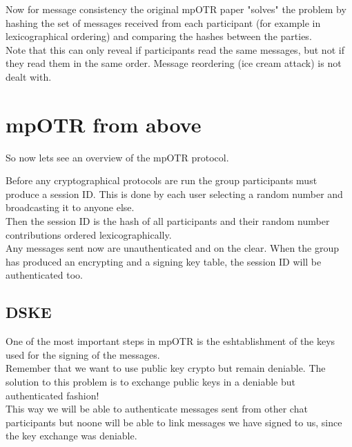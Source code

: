 \documentclass{beamer}
\begin{document}
\begin{frame}
Now for message consistency the original mpOTR paper "solves" the problem by hashing the set of messages received from each participant (for example in lexicographical ordering) and comparing the hashes between the parties.\\[0.5cm]

Note that this can only reveal if participants read the same messages, but not if they read them in the same order. Message reordering (ice cream attack) is not dealt with.
\end{frame}

\section{mpOTR from above}
\begin{frame}
So now lets see an overview of the mpOTR protocol.
\end{frame}

\begin{frame}
Before any cryptographical protocols are run the group participants must produce a session ID.  This is done by each user selecting a random number and broadcasting it to anyone else.\\[0.5cm]

Then the session ID is the hash of all participants and their random number contributions ordered lexicographically.\\[0.5cm]

Any messages sent now are unauthenticated and on the clear. When the group has produced an encrypting and a signing key table, the session ID will be authenticated too.
\end{frame}

\subsection{DSKE}
\begin{frame}
One of the most important steps in mpOTR is the eshtablishment of the keys used for the signing of the messages.\\[0.5cm]

Remember that we want to use public key crypto but remain deniable. The solution to this problem is to exchange public keys in a deniable but authenticated fashion!\\[0.5cm]
 
This way we will be able to authenticate messages sent from other chat participants but noone will be able to link messages we have signed to us, since the key exchange was deniable.
\end{frame}
\end{document}
